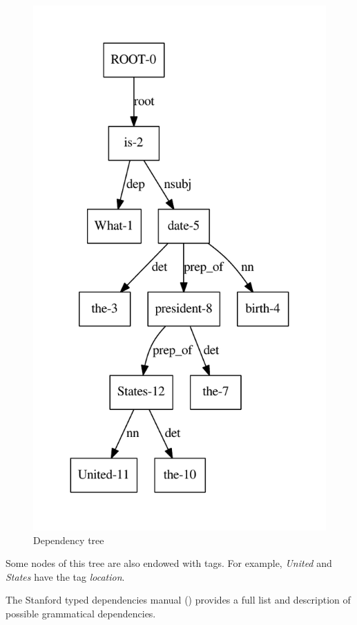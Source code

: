 \begin{figure}
  \centering
  \caption{Dependency tree}
  \label{tree_one}
    \includegraphics[scale=0.6]{../examples_NLP_grammatical/tree1.pdf}
\end{figure}

Some nodes of this tree are also endowed with tags. For example, \emph{United} and \emph{States} have the tag \emph{location}.

The Stanford typed dependencies manual (\cite{stanfordDep}) provides a full list and description of possible grammatical dependencies.

